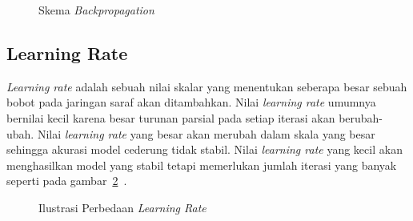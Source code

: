 \begin{figure}[htbp]
    \begin{center}
    \end{center}
    \vspace{-20pt}
    \captionsetup{labelfont=bf, textfont=bf}
    \caption{Skema \textit{Backpropagation}}
    \vspace{-10pt}
    \captionsetup{labelfont=md, textfont=md}
    \label{fig:backprop}
\end{figure}

\subsection{Learning Rate}

\textit{Learning rate} adalah sebuah nilai skalar yang menentukan seberapa besar sebuah bobot pada
jaringan saraf akan ditambahkan. Nilai \textit{learning rate} umumnya bernilai kecil karena
besar turunan parsial pada setiap iterasi akan berubah-ubah. Nilai \textit{learning rate} yang besar
akan merubah dalam skala yang besar sehingga akurasi model cederung tidak stabil. Nilai
\textit{learning rate} yang kecil akan menghasilkan model yang stabil tetapi memerlukan jumlah iterasi
yang banyak seperti pada gambar~\ref{fig:backprop}~\cite{2019arXiv190801878Y}.

\begin{figure}[htbp]
    \begin{center}
    \end{center}
    \vspace{-20pt}
    \captionsetup{labelfont=bf, textfont=bf}
    \caption{Ilustrasi Perbedaan \textit{Learning Rate}}
    \vspace{-10pt}
    \captionsetup{labelfont=md, textfont=md}
    \label{fig:backprop}
\end{figure}

